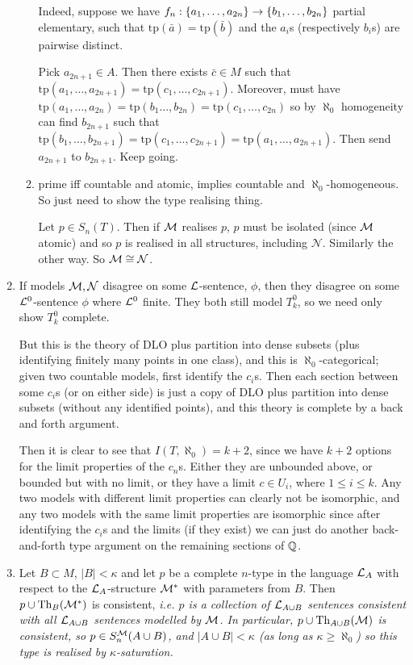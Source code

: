 \documentclass[10pt]{article}
\renewcommand{\N}{\mathcal{N}}
\newcommand{\tp}{\textrm{tp}}
\begin{document}
\begin{enumerate}
\begin{enumerate}[label = (\alph*)]
        Indeed, suppose we have $f_n : \{a_1,\dots,a_{2n}\} \rightarrow \{b_1,\dots,b_{2n}\}$ partial elementary, such that $\tp(\bar{a}) = \tp(\bar{b})$ and the $a_i$s (respectively $b_i$s) are pairwise distinct.

        Pick $a_{2n+1} \in A$. Then there exists $\bar{c}\in M$ such that $\tp(a_1,\dots,a_{2n+1}) = \tp(c_1,\dots,c_{2n+1})$. Moreover, must have $\tp(a_1,\dots,a_{2n}) = \tp(b_1\dots,b_{2n}) = \tp(c_1,\dots,c_{2n})$ so by $\aleph_0$ homogeneity can find $b_{2n+1}$ such that $\tp(b_1,\dots,b_{2n+1}) = \tp (c_1,\dots,c_{2n+1}) = \tp(a_1,\dots,a_{2n+1})$. Then send $a_{2n+1}$ to $b_{2n+1}$. Keep going.

        \item prime iff countable and atomic, implies countable and $\aleph_0$-homogeneous. So just need to show the type realising thing.
        
        Let $p \in S_n(T)$. Then if $\mathcal{M}$ realises $p$, $p$ must be isolated (since $\mathcal{M}$ atomic) and so $p$ is realised in all structures, including $\N$. Similarly the other way. So $\M\cong\N$.
    \end{enumerate}

    \item If models $\M,\N$ disagree on some $\mathcal{L}$-sentence, $\phi$, then they disagree on some $\mathcal{L}^0$-sentence $\phi$ where $\mathcal{L}^0$ finite. They both still model $T_k^0$, so we need only show $T_k^0$ complete.
    
    But this is the theory of DLO plus partition into dense subsets (plus identifying finitely many points in one class), and this is $\aleph_0$-categorical; given two countable models, first identify the $c_i$s. Then each section between some $c_i$s (or on either side) is just a copy of DLO plus partition into dense subsets (without any identified points), and this theory is complete by a back and forth argument.

    Then it is clear to see that $I(T,\aleph_0) =k + 2$, since we have $k+2$ options for the limit properties of the $c_n$s. Either they are unbounded above, or bounded but with no limit, or they have a limit $c \in U_i$, where $1\le i \le k$. Any two models with different limit properties can clearly not be isomorphic, and any two models with the same limit properties are isomorphic since after identifying the $c_i$s and the limits (if they exist) we can just do another back-and-forth type argument on the remaining sections of $\mathbb{Q}$.

    \item Let $B\subset M$, $|B| <\kappa$ and let $p$ be a complete $n$-type in the language $\mathcal{L}_A$ with respect to the $\mathcal{L}_A$-structure $\mathcal{M}^\ast$ with parameters from $B$. Then $p \cup \textrm{Th}_B(\mathcal{M}^\ast)$ is consistent, \it{i.e.} $p$ is a collection of $\mathcal{L}_{A\cup B}$ sentences consistent with all $\mathcal{L}_{A\cup B}$ sentences modelled by $\mathcal{M}$. In particular, $p \cup \textrm{Th}_{A\cup B}(\mathcal{M})$ is consistent, so $p \in S^{\mathcal{M}}_n(A\cup B)$, and $|A\cup B| < \kappa$ (as long as $\kappa \ge \aleph_0$) so this type is realised by $\kappa$-saturation.
    

\end{enumerate}
\end{document}
